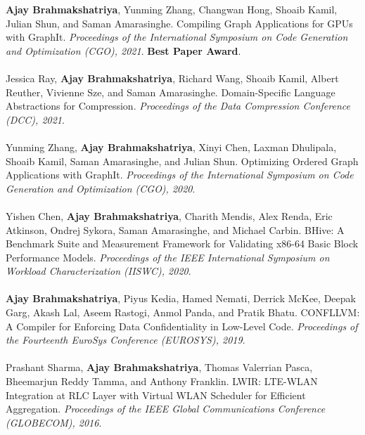 \documentclass[10pt]{article}
\newcommand{\textbfx}[1]{{\bf #1}}
\newcommand{\textitx}[1]{{\it #1}}
\begin{document}
\textbfx{Ajay Brahmakshatriya}, Yunming Zhang, Changwan Hong, Shoaib Kamil, Julian Shun, and Saman Amarasinghe. Compiling Graph Applications for GPUs with GraphIt. 
\textitx{Proceedings of the International Symposium on Code Generation and Optimization (CGO), 2021}. \textbfx{Best Paper Award}. 
\\ \\
Jessica Ray, \textbfx{Ajay Brahmakshatriya}, Richard Wang, Shoaib Kamil, Albert Reuther, Vivienne Sze, and Saman Amarasinghe. Domain-Specific Language Abstractions for Compression.
\textitx{Proceedings of the Data Compression Conference (DCC), 2021}. 
\\ \\
Yunming Zhang, \textbfx{Ajay Brahmakshatriya}, Xinyi Chen, Laxman Dhulipala, Shoaib Kamil, Saman Amarasinghe, and Julian Shun. Optimizing Ordered Graph Applications with GraphIt. 
\textitx{Proceedings of the International Symposium on Code Generation and Optimization (CGO), 2020}. 
\\ \\
Yishen Chen, \textbfx{Ajay Brahmakshatriya}, Charith Mendis, Alex Renda, Eric Atkinson, Ondrej Sykora, Saman Amarasinghe, and Michael Carbin. BHive: A Benchmark Suite and Measurement Framework for Validating x86-64 Basic Block Performance Models. 
\textitx{Proceedings of the IEEE International Symposium on Workload Characterization (IISWC), 2020}.
\\ \\
\textbfx{Ajay Brahmakshatriya}, Piyus Kedia, Hamed Nemati, Derrick McKee, Deepak Garg, Akash Lal, Aseem Rastogi, Anmol Panda, and Pratik Bhatu. CONFLLVM: A Compiler for Enforcing Data Confidentiality in Low-Level Code. 
\textitx{Proceedings of the Fourteenth EuroSys Conference (EUROSYS), 2019}.
\\ \\
Prashant Sharma, \textbfx{Ajay Brahmakshatriya}, Thomas Valerrian Pasca, Bheemarjun Reddy Tamma, and Anthony Franklin. LWIR: LTE-WLAN Integration at RLC Layer with Virtual WLAN Scheduler for Efficient Aggregation. 
\textitx{Proceedings of the IEEE Global Communications Conference (GLOBECOM), 2016}.
\\ \\ 
\end{document}
